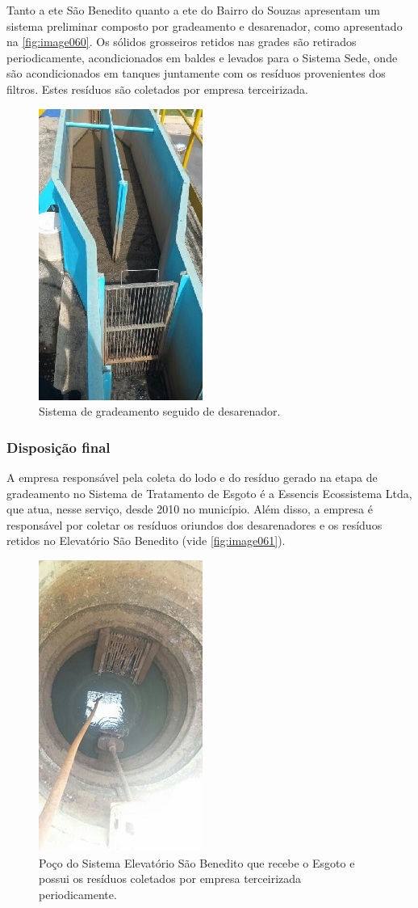 Tanto a \gls{ete} São Benedito quanto a \gls{ete} do Bairro do Souzas apresentam um sistema preliminar composto por gradeamento e desarenador, como apresentado na \autoref{fig:image060}. Os sólidos grosseiros retidos nas grades são retirados periodicamente, acondicionados em baldes e levados para o Sistema Sede, onde são acondicionados em tanques juntamente com os resíduos provenientes dos filtros. Estes resíduos são coletados por empresa terceirizada.

\begin{figure}
	\centering
	\includegraphics[width=0.25\linewidth]{produtos/prodtres/image060}
	\caption{Sistema de gradeamento seguido de desarenador.}
	\label{fig:image060}
\end{figure}


\subsubsection{Disposição final}

A empresa responsável pela coleta do lodo e do resíduo gerado na etapa de gradeamento no Sistema de Tratamento de Esgoto é a Essencis Ecossistema Ltda, que atua, nesse serviço, desde 2010 no município. Além disso, a empresa é responsável por coletar os resíduos oriundos dos desarenadores e os resíduos retidos no Elevatório São Benedito (vide \autoref{fig:image061}). 

\begin{figure}
	\centering
	\includegraphics[width=0.25\linewidth]{produtos/prodtres/image061}
	\caption{Poço do Sistema Elevatório São Benedito que recebe o Esgoto e possui os resíduos coletados por empresa terceirizada periodicamente.}
	\label{fig:image061}
\end{figure}


